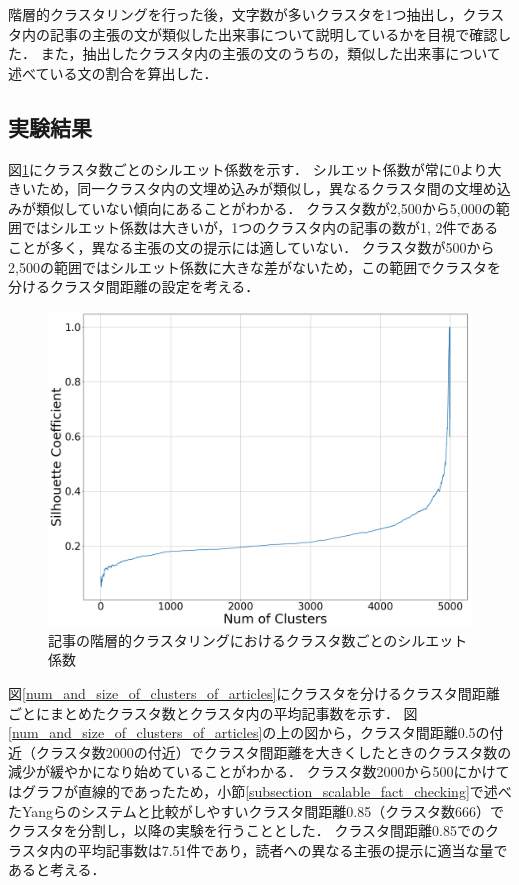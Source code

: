 \documentclass[12pt,a4j,dvipdfmx]{jreport}
\begin{document}
階層的クラスタリングを行った後，文字数が多いクラスタを1つ抽出し，クラスタ内の記事の主張の文が類似した出来事について説明しているかを目視で確認した．
また，抽出したクラスタ内の主張の文のうちの，類似した出来事について述べている文の割合を算出した．

\newpage

\subsection{実験結果}
\label{subsection_articles_clustering_result}

図\ref{articles_silhouette}にクラスタ数ごとのシルエット係数を示す．
シルエット係数が常に0より大きいため，同一クラスタ内の文埋め込みが類似し，異なるクラスタ間の文埋め込みが類似していない傾向にあることがわかる．
クラスタ数が2,500から5,000の範囲ではシルエット係数は大きいが，1つのクラスタ内の記事の数が1, 2件であることが多く，異なる主張の文の提示には適していない．
クラスタ数が500から2,500の範囲ではシルエット係数に大きな差がないため，この範囲でクラスタを分けるクラスタ間距離の設定を考える．

\begin{figure}[H]
	\centering
	\includegraphics[keepaspectratio, width=120mm]{img/process-06_articles-cluster_num-of-clusters-dependency-on-silhouette-coefficient_with-maximal-silhoette_reduced-data-to-5000_Trim.png}
	\caption{記事の階層的クラスタリングにおけるクラスタ数ごとのシルエット係数}
	\label{articles_silhouette}
\end{figure}

\newpage

図\ref{num_and_size_of_clusters_of_articles}にクラスタを分けるクラスタ間距離ごとにまとめたクラスタ数とクラスタ内の平均記事数を示す．
図\ref{num_and_size_of_clusters_of_articles}の上の図から，クラスタ間距離0.5の付近（クラスタ数2000の付近）でクラスタ間距離を大きくしたときのクラスタ数の減少が緩やかになり始めていることがわかる．
クラスタ数2000から500にかけてはグラフが直線的であったため，小節\ref{subsection_scalable_fact_checking}で述べたYangらのシステムと比較がしやすいクラスタ間距離0.85（クラスタ数666）でクラスタを分割し，以降の実験を行うこととした\cite{yang_scalable_2021}．
クラスタ間距離0.85でのクラスタ内の平均記事数は7.51件であり，読者への異なる主張の提示に適当な量であると考える．
\end{document}
